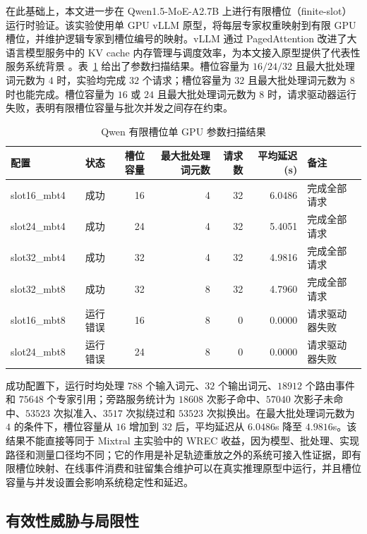 在此基础上，本文进一步在 Qwen1.5-MoE-A2.7B 上进行有限槽位（finite-slot）运行时验证。该实验使用单 GPU vLLM 原型，将每层专家权重映射到有限 GPU 槽位，并维护逻辑专家到槽位编号的映射。vLLM 通过 PagedAttention 改进了大语言模型服务中的 KV cache 内存管理与调度效率，为本文接入原型提供了代表性服务系统背景 \cite{kwon2023pagedattention,kwon2023efficient}。表~\ref{tab:finite-slot-runtime} 给出了参数扫描结果。槽位容量为 $16/24/32$ 且最大批处理词元数为 $4$ 时，实验均完成 $32$ 个请求；槽位容量为 $32$ 且最大批处理词元数为 $8$ 时也能完成。槽位容量为 $16$ 或 $24$ 且最大批处理词元数为 $8$ 时，请求驱动器运行失败，表明有限槽位容量与批次并发之间存在约束。

\begin{table}[!htbp]
    \centering
    \caption{\label{tab:finite-slot-runtime}Qwen 有限槽位单 GPU 参数扫描结果}
    \begin{tabularx}{\linewidth}{lrrrrrX}
        \hline
        配置 & 状态 & 槽位容量 & 最大批处理词元数 & 请求数 & 平均延迟(s) & 备注 \\ \hline
        slot16\_mbt4 & 成功 & 16 & 4 & 32 & 6.0486 & 完成全部请求 \\ \hline
        slot24\_mbt4 & 成功 & 24 & 4 & 32 & 5.4051 & 完成全部请求 \\ \hline
        slot32\_mbt4 & 成功 & 32 & 4 & 32 & 4.9816 & 完成全部请求 \\ \hline
        slot32\_mbt8 & 成功 & 32 & 8 & 32 & 4.7960 & 完成全部请求 \\ \hline
        slot16\_mbt8 & 运行错误 & 16 & 8 & 0 & 0.0000 & 请求驱动器失败 \\ \hline
        slot24\_mbt8 & 运行错误 & 24 & 8 & 0 & 0.0000 & 请求驱动器失败 \\ \hline
    \end{tabularx}
\end{table}
\FloatBarrier

成功配置下，运行时均处理 $788$ 个输入词元、$32$ 个输出词元、$18912$ 个路由事件和 $75648$ 个专家引用；旁路服务统计为 $18608$ 次影子命中、$57040$ 次影子未命中、$53523$ 次拟准入、$3517$ 次拟绕过和 $53523$ 次拟换出。在最大批处理词元数为 $4$ 的条件下，槽位容量从 $16$ 增加到 $32$ 后，平均延迟从 $6.0486$s 降至 $4.9816$s。该结果不能直接等同于 Mixtral 主实验中的 WREC 收益，因为模型、批处理、实现路径和测量口径均不同；它的作用是补足轨迹重放之外的系统可接入性证据，即有限槽位映射、在线事件消费和驻留集合维护可以在真实推理原型中运行，并且槽位容量与并发设置会影响系统稳定性和延迟。

\subsection{有效性威胁与局限性}

